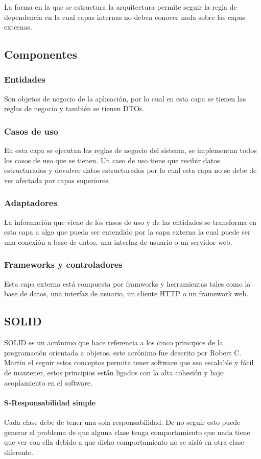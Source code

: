 La forma en la que se estructura la arquitectura permite seguir la regla de dependencia en la cual capas internas no deben conocer nada sobre las capas externas.
\subsection{Componentes}
\subsubsection{Entidades}
Son objetos de negocio de la aplicación, por lo cual en esta capa se tienen las reglas de negocio y también se tienen DTOs. 
\subsubsection{Casos de uso}
En esta capa se ejecutan las reglas de negocio del sistema, se implementan todos los casos de uso que se tienen. Un caso de uso tiene que recibir datos estructurados y devolver datos estructurados por lo cual esta capa no se debe de ver afectada por capas superiores.
\subsubsection{Adaptadores}
La información que viene de los casos de uso y de las entidades se transforma en esta capa a algo que pueda ser entendido por la capa externa la cual puede ser una conexión a base de datos, una interfaz de usuario o un servidor web.
\subsubsection{Frameworks y controladores}
Esta capa externa está compuesta por framworks y herramientas tales como la base de datos, una interfaz de usuario, un cliente HTTP o un framework web.
\subsection{SOLID}
SOLID es un acrónimo que hace referencia a los cinco principios de la programación orientada a objetos, este acrónimo fue descrito por Robert C. Martin el seguir estos conceptos permite tener software que sea escalable y fácil de mantener, estos principios están ligados con la alta cohesión y bajo acoplamiento en el software. \cite{solidCode}
\paragraph{S-Responsabilidad simple} Cada clase debe de tener una sola responsabilidad. De no seguir esto puede generar el problema de que alguna clase tenga comportamiento que nada tiene que ver con ella debido a que dicho comportamiento no se aisló en otra clase diferente. \cite{solidEjemplos}
